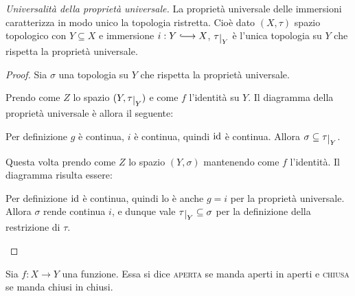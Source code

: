 \begin{thm}
    \emph{Universalit\`a della proprietà universale.} La proprietà universale
    delle immersioni caratterizza in modo unico la topologia ristretta. Cio\`e
    dato $(X, \tau)$ spazio topologico con $Y \subseteq X$ e immersione ${i: Y
    \hooklongrightarrow X}$, $\tau\restrict{Y}$ \`e l'unica topologia su $Y$ che
    rispetta la proprietà universale.
\end{thm}

\begin{proof}
    Sia $\sigma$ una topologia su $Y$ che rispetta la propriet\`a universale.
    \begin{nlist}
        \item Prendo come $Z$ lo spazio $(Y, \tau\restrict{Y})$ e come $f$
        l'identità su $Y$. Il diagramma della proprietà universale \`e allora il
        seguente:

        \begin{center}\end{center}

        Per definizione $g$ \`e continua, $i$ \`e continua, quindi $\operatorname{id}$ \`e
        continua. Allora $\sigma \subseteq \tau\restrict{Y}$.

        \item Questa volta prendo come $Z$ lo spazio $(Y, \sigma)$ mantenendo
        come $f$ l'identità. Il diagramma risulta essere:

        \begin{center}\end{center}

        Per definizione $\operatorname{id}$ \`e continua, quindi lo \`e anche $g=i$ per la
        propriet\`a universale. Allora $\sigma$ rende continua $i$, e dunque
        vale $\tau\restrict{Y} \subseteq \sigma$ per la definizione della
        restrizione di $\tau$.
    \end{nlist}
\end{proof}
\begin{defn}
    Sia $f:X\longrightarrow Y$ una funzione. Essa si dice \textsc{aperta} se
    manda aperti in aperti e \textsc{chiusa} se manda chiusi in chiusi.
\end{defn}

